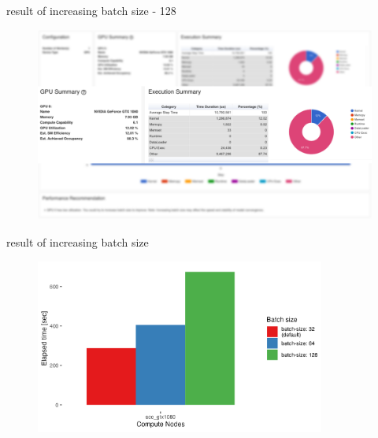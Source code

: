 \documentclass[compress,aspectratio=169]{beamer}
\begin{document}
\begin{frame}{result of increasing batch size - 128}

\begin{center}
    \begin{figure}
        \includegraphics[width=1\textwidth]{../../data/scap_gtx1080_profiler-torch_batch-size-128_14633534_zoom}
    \end{figure}
    \end{center}

\end{frame}

\begin{frame}{result of increasing batch size}
    \vspace{-1em}
    \begin{center}
        \begin{figure}
            \includegraphics[width=0.85\textwidth]{../../data/sacct_barplot_by_nodes_batch-size-effect}

        \end{figure}
    \end{center}
\end{frame}
\end{document}
